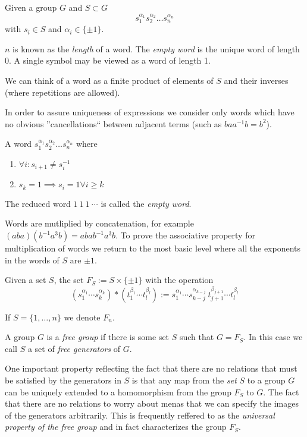 \begin{definition}[Word]
   Given a group \(G\) and \(S \subset G\)
   \[s_1^{\alpha_1}s_2^{\alpha_2}\ldots s_n^{\alpha_n}\]
   with \(s_i \in S\) and \(\alpha_i \in \{\pm 1\}\).
\end{definition}
\begin{remark}[Terminology]
   \(n\) is known as the \emph{length} of a word.
   The \emph{empty word} is the unique word of length 0.
   A single symbol may be viewed as a word of length 1.
\end{remark}
\begin{remark}[Intuition]
   We can think of a word as a finite product of elements of \(S\) and their inverses (where repetitions are allowed).
\end{remark}
In order to assure uniqueness of expressions we consider only words which have no obvious ''cancellations`` between adjacent terms (such as \(baa^{-1}b = b^2\)).
\begin{definition}
   A word \(s_1^{\alpha_1}s_2^{\alpha_2}\ldots s_n^{\alpha_n}\) where
   \begin{enumerate}[label=\roman*, align=Center]
      \item \(\forall i: s_{i+1} \neq s_i^{-1}\)
      \item \(s_k = 1 \implies s_i = 1 \forall i \geq k\)
   \end{enumerate}
\end{definition}
\begin{remark}
   The reduced word \(1~1~1~\cdots\) is called the \emph{empty word}.
\end{remark}
Words are mutliplied by concatenation, for example \((aba)(b^{-1}a^3b) = abab^{-1}a^3b\).
To prove the associative property for multiplication of words we return to the most basic level where all the exponents in the words of \(S\) are \(\pm 1\).
\begin{definition}
   Given a set \(S\), the set \(F_S := S \times \{\pm 1\}\) with the operation
   \[(s_1^{\alpha_1}\cdots s_k^{\alpha_k}) \ast (t_1^{\beta_1}\cdots t_l^{\beta_l}) := s_1^{\alpha_1}\cdots s_{k-j}^{\alpha_{k-j}}~t_{j+1}^{\beta_{j+1}}\cdots t_l^{\beta_l}\]
\end{definition}
\begin{remark}[Notation]
   If \(S = \{1, \ldots, n\}\) we denote \(F_n\).
\end{remark}
\begin{remark}[Terminology]
   A group \(G\) is a \emph{free group} if there is some set \(S\) such that \(G = F_S\).
   In this case we call \(S\) a set of \emph{free generators} of \(G\).
\end{remark}
One important property reflecting the fact that there are no relations that must be satisfied by the generators in \(S\) is that any map from the \emph{set} \(S\) to a group \(G\) can be uniquely extended to a homomorphism from the group \(F_S\) to \(G\).
The fact that there are no relations to worry about menas that we can specify the images of the generators arbitrarily.
This is frequently reffered to as the \emph{universal property of the free group} and in fact characterizes the group \(F_S\).

